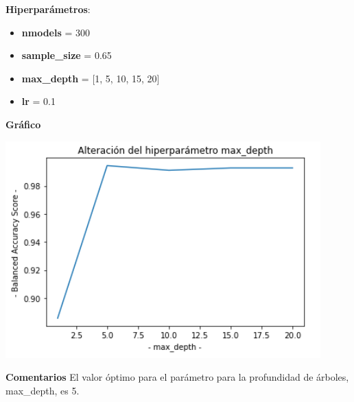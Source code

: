 \documentclass[conference,a4paper]{IEEEtran}
\begin{document}
\begin{textb}
    \textbf{Hiperparámetros}:
  \begin{itemize}
      \item \textbf{nmodels} = 300
      \item \textbf{sample\_size} = 0.65
      \item \textbf{max\_depth} = [1, 5, 10, 15, 20]
      \item \textbf{lr} = 0.1
  \end{itemize}
  \textbf{Gráfico}
  
  \begin{center}
    \includegraphics[scale=0.80]{figures/maxdepth_titanic_trees.png}
    \label{fig:funcion_clasificacion}
  \end{center}
  
  \textbf{Comentarios} El valor óptimo para el parámetro para la profundidad de árboles, max\_depth, es 5.
\end{textb}
\end{document}
